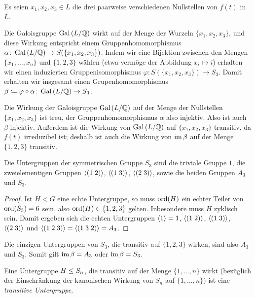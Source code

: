 Es seien $x_1, x_2, x_3 \in L$ die drei paarweise verschiedenen Nullstellen von $f(t)$ in $L$.

Die Galoisgruppe $\operatorname{Gal}{(}L/\mathbb{Q})$ wirkt auf der Menge der Wurzeln $\{x_1, x_2, x_3\}$, und diese Wirkung entspricht einem Gruppenhomomorphismus $\alpha \colon \operatorname{Gal}{(}L/\mathbb{Q}) \to S(\{x_1, x_2, x_3\})$.
Indem wir eine Bijektion zwischen den Mengen $\{x_1, \dotsc, x_n\}$ und $\{1, 2, 3\}$ wählen (etwa vermöge der Abbildung $x_i \mapsto i$) erhalten wir einen induzierten Gruppenisomorphismus $\varphi \colon S(\{x_1, x_2, x_3\}) \to S_3$.
Damit erhalten wir insgesamt einen Grupenhomomorphismus $\beta \coloneqq \varphi \circ \alpha \colon \operatorname{Gal}{(}L/\mathbb{Q}) \to S_3$.

Die Wirkung der Galoisgruppe $\operatorname{Gal}{(}L/\mathbb{Q})$ auf der Menge der Nullstellen $\{x_1, x_2, x_3\}$ ist treu, der Gruppenhomomorphismus $\alpha$ also injektiv.
Also ist auch $\beta$ injektiv.
Außerdem ist die Wirkung von $\operatorname{Gal}{(}L/\mathbb{Q})$ auf $\{x_1, x_2, x_3\}$ transitiv, da $f(t)$ irreduzibel ist;
deshalb ist auch die Wirkung von $\operatorname{im} \beta$ auf der Menge $\{1, 2, 3\}$ transitiv.

\begin{lemma}
  Die Untergruppen der symmetrischen Gruppe $S_3$ sind die triviale Gruppe $1$, die zweielementigen Gruppen $\langle(1\;2)\rangle$, $\langle(1\;3)\rangle$, $\langle(2\;3)\rangle$, sowie die beiden Gruppen $A_3$ und $S_3$.
\end{lemma}

\begin{proof}
  Ist $H < G$ eine echte Untergruppe, so muss $\operatorname{ord}(H)$ ein echter Teiler von $\operatorname{ord}(S_3) = 6$ sein, also $\operatorname{ord}(H) \in \{1, 2, 3\}$ gelten.
  Inbesondere muss $H$ zyklisch sein.
  Damit ergeben sich die echten Untergruppen $\langle1\rangle = 1$, $\langle(1\;2)\rangle$, $\langle(1\;3)\rangle$, $\langle(2\;3)\rangle$ und $\langle(1\;2\;3)\rangle = \langle(1\;3\;2)\rangle = A_3$.
\end{proof}

Die einzigen Untergruppen von $S_3$, die transitiv auf $\{1, 2, 3\}$ wirken, sind also $A_3$ und $S_3$.
Somit gilt $\operatorname{im} \beta = A_3$ oder $\operatorname{im} \beta = S_3$.

\begin{remark}
  Eine Untergruppe $H \leq S_n$, die transitiv auf der Menge $\{1, \dotsc, n\}$ wirkt (bezüglich der Einschränkung der kanonischen Wirkung von $S_n$ auf $\{1, \dotsc, n\}$) ist eine \emph{transitive Untergruppe}.
\end{remark}





